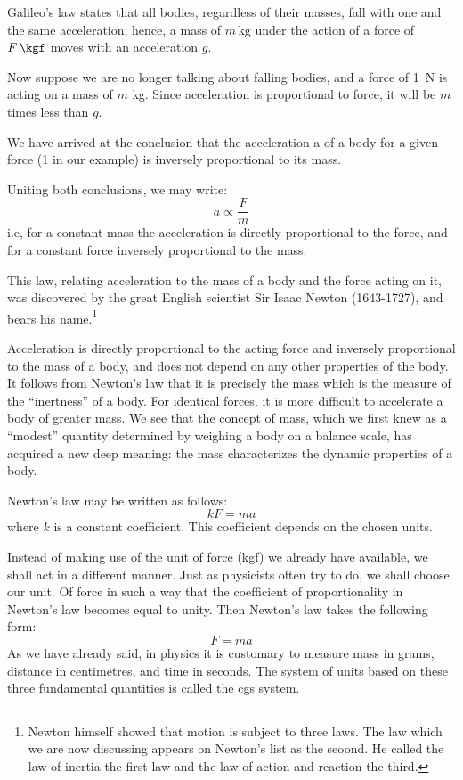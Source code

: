 Galileo's law states that all bodies, regardless of their
masses, fall with one and the same acceleration; hence,
a mass of $m \, \si{\kilo\gram}$ under the action of a force of $F \,\si{\kgf}$ moves with an acceleration $g$.

Now suppose we are no longer talking about falling bodies, and a force of \SI{1}{\newton} is acting on a mass of $m$ \si{\kilo\gram}. Since acceleration is proportional to force, it will be $m$
times less than $g$.

We have arrived at the conclusion that the acceleration
a of a body for a given force (\SI{1}{\kgf} in our example) is
inversely proportional to its mass.

Uniting both conclusions, we may write:
\begin{equation*}%
a \propto \frac{F}{m}
\end{equation*}
i.e, for a constant mass the acceleration is directly proportional to the force, and for a constant force inversely proportional to the mass.

This law, relating acceleration to the mass of a body
and the force acting on it, was discovered by the great
English scientist Sir Isaac Newton (1643-1727), and
bears his name.\footnote{Newton himself showed that motion is subject to three laws. The law which we are now discussing appears on Newton's
list as the seoond. He called the law of inertia the first law and the law of action and reaction the third.}

Acceleration is directly proportional to the acting
force and inversely proportional to the mass of a body,
and does not depend on any other properties of the body.
It follows from Newton's law that it is precisely the mass
which is the measure of the ``inertness'' of a body. For
identical forces, it is more difficult to accelerate a body
of greater mass. We see that the concept of mass, which
we first knew as a ``modest'' quantity determined by
weighing a body on a balance scale, has acquired a new
deep meaning: the mass characterizes the dynamic properties of a body.

Newton's law may be written as follows:
\begin{equation*}%
kF = ma
\end{equation*}
where $k$ is a constant coefficient. This coefficient depends
on the chosen units.


Instead of making use of the unit of force (\si{kgf}) we
already have available, we shall act in a different manner.
Just as physicists often try to do, we shall choose our
unit. Of force in such a way that the coefficient of proportionality in Newton's law becomes equal to unity. Then Newton's law takes the following form:
\begin{equation*}%
F = ma
\end{equation*}
As we have already said, in physics it is customary to
measure mass in grams, distance in centimetres, and time
in seconds. The system of units based on these three fundamental quantities is called the cgs system.

